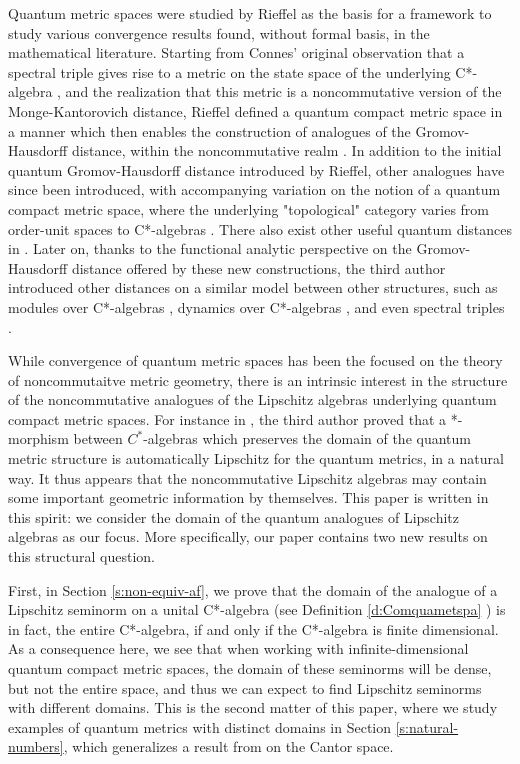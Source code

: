\documentclass[]{amsart}
\theoremstyle{plain}
\theoremstyle{definition}
\theoremstyle{remark}
\numberwithin{equation}{section}
\begin{document}
Quantum metric spaces were studied by Rieffel \cite{Rieffel98a, Rieffel99} as the basis for a framework to study various convergence results found, without formal basis, in the mathematical literature. Starting from Connes' original observation that a spectral triple gives rise to a metric on the state space of the underlying C*-algebra \cite{Connes89}, and the realization that this metric is a noncommutative version of the Monge-Kantorovich distance, Rieffel defined a quantum compact metric space in a manner which then enables the construction of analogues of the Gromov-Hausdorff distance, within the noncommutative realm \cite{Rieffel00}. In addition to the initial quantum Gromov-Hausdorff distance introduced by Rieffel, other analogues have since been introduced, with accompanying variation on the notion of a quantum compact metric space, where the underlying "topological" category varies from order-unit spaces \cite{Rieffel00} to C*-algebras \cite{Latremoliere13, Latremoliere13c}. There also exist other useful quantum distances in \cite{Li04, Kerr02,  wu06a}.  Later on, thanks to the functional analytic perspective on the Gromov-Hausdorff distance offered by these new constructions, the third author introduced other distances on a similar model between other structures, such as modules over C*-algebras \cite{Latremoliere16c}, dynamics over C*-algebras \cite{Latremoliere20}, and even spectral triples \cite{Latremoliere22a}.

While convergence of quantum metric spaces has been the focused on the theory of noncommutaitve metric geometry, there is an intrinsic interest in the structure of the noncommutative analogues of the Lipschitz algebras underlying quantum compact metric spaces. For instance in \cite{Latremoliere16b}, the third author proved that a *-morphism between $C^*$-algebras which preserves the domain of the quantum metric structure is automatically Lipschitz for the quantum metrics, in a natural way. It thus appears that the noncommutative Lipschitz algebras may contain some important geometric information by themselves. This paper is written in this spirit: we consider the domain of the quantum analogues of Lipschitz algebras as our focus. More specifically, our paper contains two new results on this structural question.

First, in Section \ref{s:non-equiv-af}, we prove that the domain of the analogue of a Lipschitz seminorm on a unital C*-algebra (see Definition \ref{d:Comquametspa} ) is in fact, the entire C*-algebra, if and only if the C*-algebra is finite dimensional. As a consequence here,  we see that when working with infinite-dimensional quantum compact metric spaces, the domain of these seminorms will be dense, but not the entire space, and thus we can expect to find Lipschitz seminorms with different domains. This is the second matter of this paper, where we study examples of quantum metrics with distinct domains in Section \ref{s:natural-numbers},   which generalizes a result from \cite{Aguilar-Latremoliere15} on the Cantor space.
\end{document}
